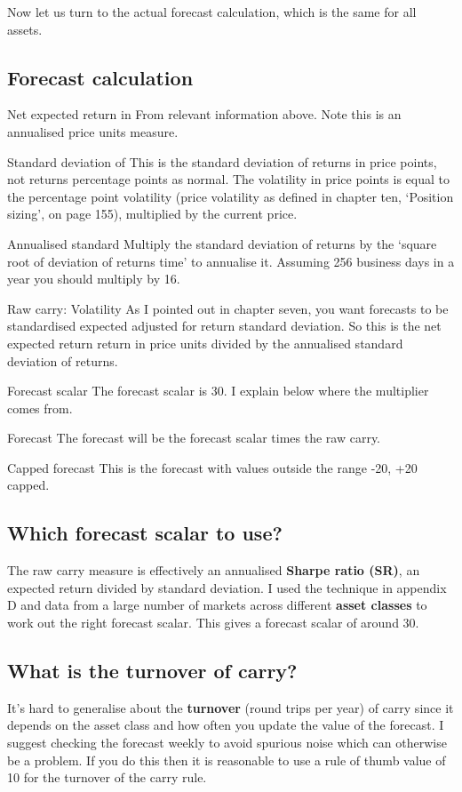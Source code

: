 Now let us turn to the actual forecast calculation, which is the same for all assets.

\subsection*{Forecast calculation}

Net expected return in From relevant information above. Note this is an annualised price units measure.

Standard deviation of This is the standard deviation of returns in price points, not returns percentage points as normal. The volatility in price points is equal to the percentage point volatility (price volatility as defined in chapter ten, ‘Position sizing', on page 155), multiplied by the current price.

Annualised standard Multiply the standard deviation of returns by the ‘square root of deviation of returns time' to annualise it. Assuming 256 business days in a year you should multiply by 16.

Raw carry: Volatility As I pointed out in chapter seven, you want forecasts to be standardised expected adjusted for return standard deviation. So this is the net expected return return in price units divided by the annualised standard deviation of returns.

Forecast scalar The forecast scalar is 30. I explain below where the multiplier comes from.

Forecast The forecast will be the forecast scalar times the raw carry.

Capped forecast This is the forecast with values outside the range -20, +20 capped.

\subsection*{Which forecast scalar to use?}

The raw carry measure is effectively an annualised \textbf{Sharpe ratio (SR)}, an expected return divided by standard deviation. I used the technique in appendix D and data from a large number of markets across different \textbf{asset classes} to work out the right forecast scalar. This gives a forecast scalar of around 30.

\subsection*{What is the turnover of carry?}

It's hard to generalise about the \textbf{turnover} (round trips per year) of carry since it depends on the asset class and how often you update the value of the forecast. I suggest checking the forecast weekly to avoid spurious noise which can otherwise be a problem. If you do this then it is reasonable to use a rule of thumb value of 10 for the turnover of the carry rule.

